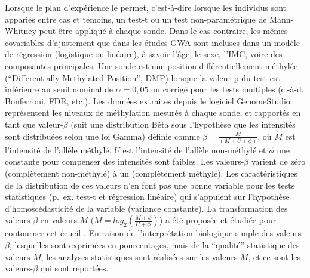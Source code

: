 \documentclass[11pt,a4paper,notrimn]{krantz}
\theoremstyle{definition}
\theoremstyle{definition}
\theoremstyle{remark}
\begin{document}
Lorsque le plan d'expérience le permet, c'est-à-dire lorsque les
individus sont appariés entre cas et témoins, un test-t ou un test
non-paramétrique de Mann-Whitney peut être appliqué à chaque sonde. Dans
le cas contraire, les mêmes covariables d'ajustement que dans les études
GWA sont incluses dans un modèle de régression (logistique ou linéaire),
à savoir l'âge, le sexe, l'IMC, voire des composantes principales. Une
sonde est une position différentiellement méthylée (``Differentially
Methylated Position'', DMP) lorsque la valeur-p du test est inférieure
au seuil nominal de \(\alpha=0,05\) ou corrigé pour les tests multiples
(c.-à-d. Bonferroni, FDR, etc.). Les données extraites depuis le
logiciel GenomeStudio représentent les niveaux de méthylation mesurés à
chaque sonde, et rapportés en tant que valeur-\(\beta\) (suit une
distribution Bêta sous l'hypothèse que les intensités sont distribuées
selon une loi Gamma) définie comme \(\beta=\frac{M}{(M+U+\phi)}\), où
\(M\) est l'intensité de l'allèle méthylé, \(U\) est l'intensité de
l'allèle non-méthylé et \(\phi\) une constante pour compenser des
intensités sont faibles. Les valeurs-\(\beta\) varient de zéro
(complètement non-méthylé) à un (complètement méthylé). Les
caractéristiques de la distribution de ces valeurs n'en font pas une
bonne variable pour les tests statistiques (p.~ex. test-t et régression
linéaire) qui s'appuient sur l'hypothèse d'homoscédasticité de la
variable (variance constante). La transformation des valeurs-\(\beta\)
en valeurs-\(M\) (\(M=log_2\left(\frac{M+\phi}{U+\phi}\right)\)) a été
proposée et étudiée pour contourner cet écueil
\citep{du_comparison_2010}. En raison de l'interprétation biologique
simple des valeurs-\(\beta\), lesquelles sont exprimées en pourcentages,
mais de la ``qualité'' statistique des valeurs-\(M\), les analyses
statistiques sont réalisées sur les valeurs-\(M\), et ce sont les
valeurs-\(\beta\) qui sont reportées.
\end{document}
